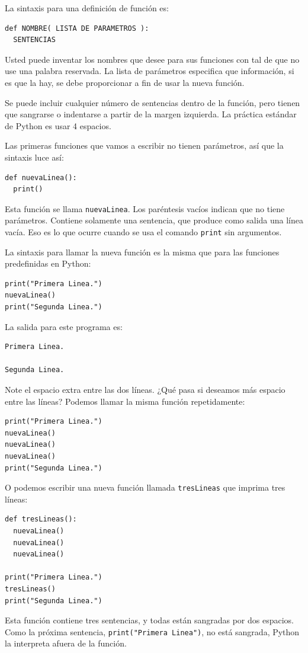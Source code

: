   

La sintaxis para una definición de función es:

\begin{verbatim}
def NOMBRE( LISTA DE PARAMETROS ):
  SENTENCIAS
\end{verbatim}
 Usted puede inventar los nombres que desee para sus funciones con
tal de que no use una palabra reservada. La lista de parámetros especifica
que información, si es que la hay, se debe proporcionar a fin de usar
la nueva función.

Se puede incluir cualquier número de sentencias dentro de la función,
pero tienen que sangrarse o indentarse a partir de la margen izquierda.
La práctica estándar de Python es usar 4 espacios.

Las primeras funciones que vamos a escribir no tienen parámetros,
así que la sintaxis luce así:

\begin{verbatim}
def nuevaLinea():
  print()
\end{verbatim}
 Esta función se llama \texttt{nuevaLinea}. Los paréntesis vacíos
indican que no tiene parámetros. Contiene solamente una sentencia,
que produce como salida una línea vacía. Eso es lo que ocurre cuando
se usa el comando \texttt{print} sin argumentos.

La sintaxis para llamar la nueva función es la misma que para las
funciones predefinidas en Python:

\begin{verbatim}
print("Primera Linea.")
nuevaLinea()
print("Segunda Linea.")
\end{verbatim}
 La salida para este programa es:
\begin{verbatim}
Primera Linea.

Segunda Linea.
\end{verbatim}
Note el espacio extra entre las dos líneas. ¿Qué pasa si deseamos
más espacio entre las líneas? Podemos llamar la misma función repetidamente:

\begin{verbatim}
print("Primera Linea.")
nuevaLinea()
nuevaLinea()
nuevaLinea()
print("Segunda Linea.")
\end{verbatim}
 

O podemos escribir una nueva función llamada \texttt{tresLineas} que
imprima tres líneas:

\begin{verbatim}
def tresLineas():
  nuevaLinea()
  nuevaLinea()
  nuevaLinea()

print("Primera Linea.")
tresLineas()
print("Segunda Linea.")
\end{verbatim}
 Esta función contiene tres sentencias, y todas están sangradas por
dos espacios. Como la próxima sentencia, \texttt{print("Primera Linea")},
no está sangrada, Python la interpreta afuera de la función.

